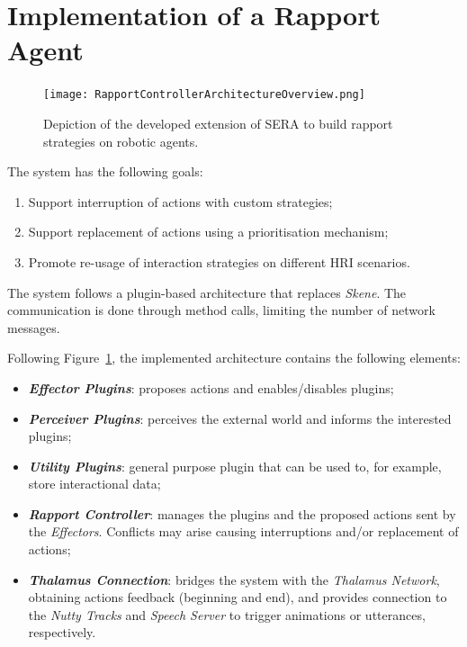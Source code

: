 \section{Implementation of a Rapport Agent}

\begin{figure}
	\centering
	\texttt{[image: RapportControllerArchitectureOverview.png]}
	\caption{Depiction of the developed extension of \ac{SERA} to build rapport strategies on robotic agents.}
	\label{fig:rapport:archicture}
\end{figure}

The system has the following goals:
\begin{enumerate}
	\item Support interruption of actions with custom strategies;
	\item Support replacement of actions using a prioritisation mechanism;
	\item Promote re-usage of interaction strategies on different \ac{HRI} scenarios.
\end{enumerate}

The system follows a plugin-based architecture that replaces \textit{Skene}. The communication is done through method calls, limiting the number of network messages. %

Following Figure~\ref{fig:rapport:archicture}, the implemented architecture contains the following elements:
\begin{itemize}
	\item \textbf{\textit{Effector Plugins}}: proposes actions and enables/disables plugins;
	\item \textbf{\textit{Perceiver Plugins}}: perceives the external world and informs the interested plugins;
	\item \textbf{\textit{Utility Plugins}}: general purpose plugin that can be used to, for example, store interactional data;
	\item \textbf{\textit{Rapport Controller}}: manages the plugins and the proposed actions sent by the \textit{Effectors}. Conflicts may arise causing interruptions and/or replacement of actions;
	\item \textbf{\textit{Thalamus Connection}}: bridges the system with the \textit{Thalamus Network}, obtaining actions feedback (beginning and end), and provides connection to the \textit{Nutty Tracks} and \textit{Speech Server} to trigger animations or utterances, respectively.
\end{itemize}


